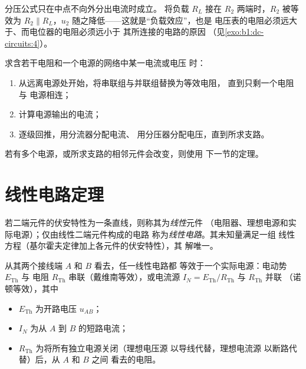 \begin{remark}[分压器的负载]\label{rem:b1:dc-circuits:loading}
分压公式只在中点不向外分出电流时成立。
将负载 $R_L$ 接在 $R_2$ 两端时，$R_2$ 被等效为 $R_2
\parallel R_L$，$u_2$ 随之降低——这就是“负载效应”，也是
电压表的电阻必须远大于、而电位器的电阻必须远小于
其所连接的电路的原因
（见\cref{exo:b1:dc-circuits:4}）。
\end{remark}

\begin{method}[化简网络]\label{met:b1:dc-circuits:reduce}
求含若干电阻和一个电源的网络中某一电流或电压
时：
\begin{enumerate}
  \item 从远离电源处开始，将串联组与并联组替换为等效电阻，
        直到只剩一个电阻与
        电源相连；
  \item 计算电源输出的电流；
  \item 逐级回推，用分流器分配电流、
        用分压器分配电压，直到所求支路。
\end{enumerate}
若有多个电源，或所求支路的相邻元件会改变，则使用
下一节的定理。
\end{method}

\section{线性电路定理}

\begin{definition}\label{def:b1:dc-circuits:linear}
若二端元件的伏安特性为一条直线，则称其为\emph{线性}元件
（电阻器、理想电源和实际电源）；仅由线性二端元件构成的电路
称为\emph{线性电路}。其未知量满足一组
线性方程（基尔霍夫定律加上各元件的伏安特性），其
解唯一。
\end{definition}

\begin{theorem}[戴维南定理与诺顿定理]\label{thm:b1:dc-circuits:thevenin}
从其两个接线端 $A$ 和 $B$ 看去，任一线性电路都
等效于一个实际电源：电动势 $E_{\mathrm{Th}}$ 与
电阻 $R_{\mathrm{Th}}$ 串联（戴维南等效），或电流源 $I_N =
E_{\mathrm{Th}}/R_{\mathrm{Th}}$ 与 $R_{\mathrm{Th}}$ 并联
（诺顿等效），其中
\begin{itemize}
  \item $E_{\mathrm{Th}}$ 为开路电压 $u_{AB}$；
  \item $I_N$ 为从 $A$ 到 $B$ 的短路电流；
  \item $R_{\mathrm{Th}}$ 为将所有独立电源关闭（理想电压源
        以导线代替，理想电流源
        以断路代替）后，从 $A$ 和 $B$ 之间
        看去的电阻。
\end{itemize}
\end{theorem}

